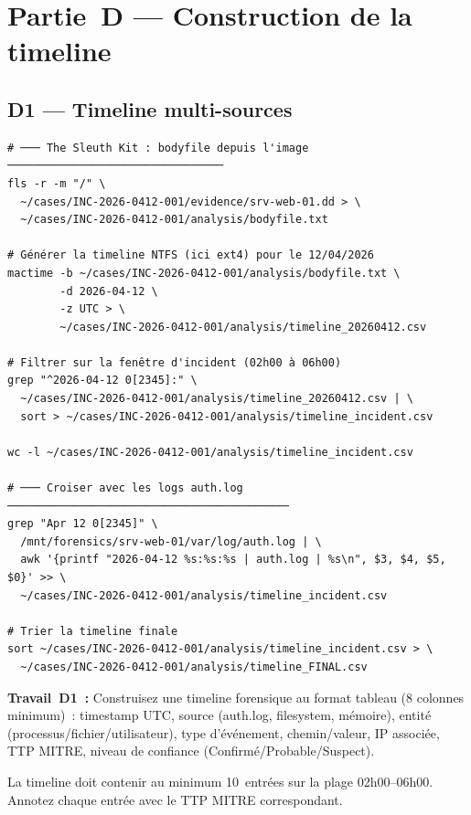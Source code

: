 \section{Partie~D — Construction de la timeline}
\label{lab2:partieD}

\subsection{D1 — Timeline multi-sources}

\begin{lstlisting}[style=StyleTerminal,
  caption={Construction de la timeline forensique complète},
  label={lst:lab2-timeline}]
# ─── The Sleuth Kit : bodyfile depuis l'image ─────────────────────────────────
fls -r -m "/" \
  ~/cases/INC-2026-0412-001/evidence/srv-web-01.dd > \
  ~/cases/INC-2026-0412-001/analysis/bodyfile.txt

# Générer la timeline NTFS (ici ext4) pour le 12/04/2026
mactime -b ~/cases/INC-2026-0412-001/analysis/bodyfile.txt \
        -d 2026-04-12 \
        -z UTC > \
        ~/cases/INC-2026-0412-001/analysis/timeline_20260412.csv

# Filtrer sur la fenêtre d'incident (02h00 à 06h00)
grep "^2026-04-12 0[2345]:" \
  ~/cases/INC-2026-0412-001/analysis/timeline_20260412.csv | \
  sort > ~/cases/INC-2026-0412-001/analysis/timeline_incident.csv

wc -l ~/cases/INC-2026-0412-001/analysis/timeline_incident.csv

# ─── Croiser avec les logs auth.log ───────────────────────────────────────────
grep "Apr 12 0[2345]" \
  /mnt/forensics/srv-web-01/var/log/auth.log | \
  awk '{printf "2026-04-12 %s:%s:%s | auth.log | %s\n", $3, $4, $5, $0}' >> \
  ~/cases/INC-2026-0412-001/analysis/timeline_incident.csv

# Trier la timeline finale
sort ~/cases/INC-2026-0412-001/analysis/timeline_incident.csv > \
  ~/cases/INC-2026-0412-001/analysis/timeline_FINAL.csv
\end{lstlisting}

\begin{boxexo}
\textbf{Travail~D1~:} Construisez une timeline forensique au format
tableau (8 colonnes minimum)~: timestamp UTC, source (auth.log,
filesystem, mémoire), entité (processus/fichier/utilisateur),
type d'événement, chemin/valeur, IP associée, TTP MITRE,
niveau de confiance (Confirmé/Probable/Suspect).

La timeline doit contenir au minimum 10~entrées sur la plage 02h00--06h00.
Annotez chaque entrée avec le TTP MITRE correspondant.
\end{boxexo}


